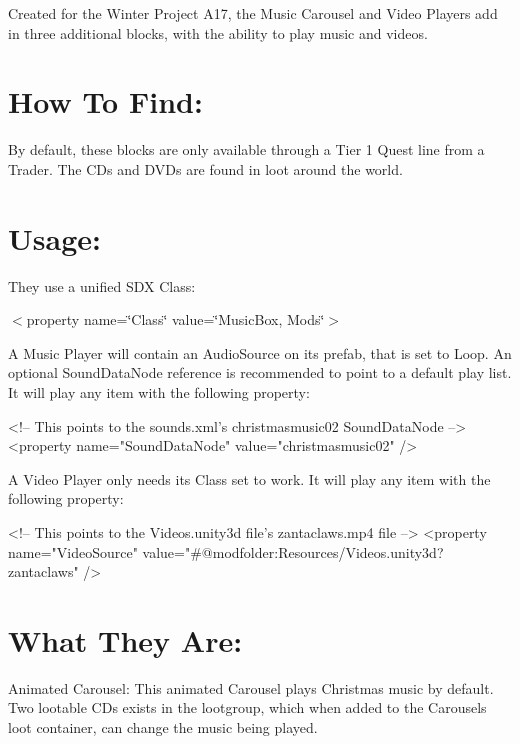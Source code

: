 Created for the Winter Project A17, the Music Carousel and Video Players add in three additional blocks, with the ability to play music and videos.\hypertarget{md__c_1__users_jkilpatrick__documents__git_hub__sphere_i_i_8_mods__sphere_i_i__music__boxes__r_e_a_d_m_e_autotoc_md33}{}\section{How To Find\+:}\label{md__c_1__users_jkilpatrick__documents__git_hub__sphere_i_i_8_mods__sphere_i_i__music__boxes__r_e_a_d_m_e_autotoc_md33}
By default, these blocks are only available through a Tier 1 Quest line from a Trader. The C\+Ds and D\+V\+Ds are found in loot around the world.\hypertarget{md__c_1__users_jkilpatrick__documents__git_hub__sphere_i_i_8_mods__sphere_i_i__music__boxes__r_e_a_d_m_e_autotoc_md34}{}\section{Usage\+:}\label{md__c_1__users_jkilpatrick__documents__git_hub__sphere_i_i_8_mods__sphere_i_i__music__boxes__r_e_a_d_m_e_autotoc_md34}
They use a unified S\+DX Class\+:

$<$property name=\char`\"{}\+Class\char`\"{} value=\char`\"{}\+Music\+Box, Mods\char`\"{}$>$

A Music Player will contain an Audio\+Source on its prefab, that is set to Loop. An optional Sound\+Data\+Node reference is recommended to point to a default play list. It will play any item with the following property\+: \begin{DoxyVerb}<!-- This points to the sounds.xml's christmasmusic02 SoundDataNode -->
<property name="SoundDataNode" value="christmasmusic02" />
\end{DoxyVerb}


A Video Player only needs it\textquotesingle{}s Class set to work. It will play any item with the following property\+: \begin{DoxyVerb}<!-- This points to the Videos.unity3d file's zantaclaws.mp4 file -->
<property name="VideoSource" value="#@modfolder:Resources/Videos.unity3d?zantaclaws" />
\end{DoxyVerb}
\hypertarget{md__c_1__users_jkilpatrick__documents__git_hub__sphere_i_i_8_mods__sphere_i_i__music__boxes__r_e_a_d_m_e_autotoc_md35}{}\section{What They Are\+:}\label{md__c_1__users_jkilpatrick__documents__git_hub__sphere_i_i_8_mods__sphere_i_i__music__boxes__r_e_a_d_m_e_autotoc_md35}
Animated Carousel\+: This animated Carousel plays Christmas music by default. Two lootable C\+Ds exists in the lootgroup, which when added to the Carousel\textquotesingle{}s loot container, can change the music being played.

